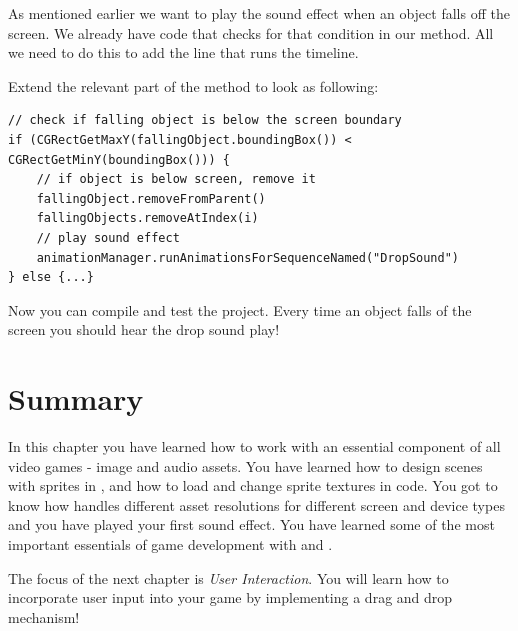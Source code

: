 As mentioned earlier we want to play the sound effect when an object falls off
the screen. We already have code that checks for that condition in our
 method. All we need to do this to add the line that runs the
timeline. 

\begin{leftbar}
Extend the relevant part of the  method to look as
following:
\begin{lstlisting}
// check if falling object is below the screen boundary
if (CGRectGetMaxY(fallingObject.boundingBox()) < CGRectGetMinY(boundingBox())) {
	// if object is below screen, remove it
    fallingObject.removeFromParent()
    fallingObjects.removeAtIndex(i)
    // play sound effect
    animationManager.runAnimationsForSequenceNamed("DropSound")
} else {...}
\end{lstlisting}
\end{leftbar}

Now you can compile and test the project. Every time an object falls of the
screen you should hear the drop sound play!

\section{Summary}
In this chapter you have learned how to work with an essential component of all
video games - image and audio assets. You have learned how to design scenes with
sprites in \SB{}, and how to load and change sprite textures in code. You got to
know how \SB{} handles different asset resolutions for different screen and
device types and you have played your first sound effect. You have learned some
of the most important essentials of game development with \SB{} and \cocos{}.

The focus of the next chapter is \textit{User Interaction}. You will learn how
to incorporate user input into your game by implementing a drag and drop
mechanism!